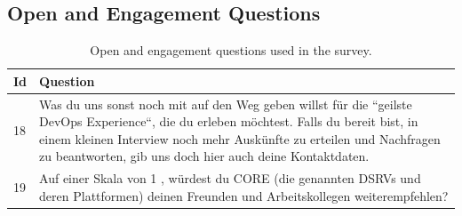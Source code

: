 \documentclass[a4paper,12pt]{article}
\begin{document}
    \subsection{Open and Engagement Questions}
    \label{subsec:openandengagement}
    \begin{table}[!htbp]
        \begin{center}
            \begin{tabularx}{\textwidth}{lX}
                \toprule
                Id & Question                                                                                                                                                                                                                                                                      \\
                \midrule
                18 & Was du uns sonst noch mit auf den Weg geben willst für die ``geilste DevOps Experience``, die du erleben möchtest. Falls du bereit bist, in einem kleinen Interview noch mehr Auskünfte zu erteilen und Nachfragen zu beantworten, gib uns doch hier auch deine Kontaktdaten. \\
                19 & Auf einer Skala von 1 \- 10, würdest du CORE (die genannten DSRVs und deren Plattformen) deinen Freunden und Arbeitskollegen weiterempfehlen?                                                                                                                                 \\
                \bottomrule
            \end{tabularx}
        \end{center}
        \caption{\label{tab:oetable} Open and engagement questions used in the survey.}
    \end{table}
    \FloatBarrier
\end{document}
